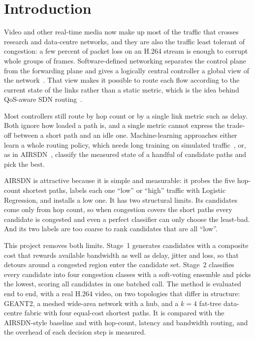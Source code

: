 \documentclass[conference,a4paper]{IEEEtran}
\begin{document}
\section{Introduction}
Video and other real-time media now make up most of the traffic that crosses research and data-centre networks,
and they are also the traffic least tolerant of congestion: a few percent of packet loss on an H.264 stream is
enough to corrupt whole groups of frames. Software-defined networking separates the control plane from the
forwarding plane and gives a logically central controller a global view of the network~\cite{mckeown2008openflow,
kreutz2015sdn}. That view makes it possible to route each flow according to the current state of the links rather
than a static metric, which is the idea behind QoS-aware SDN routing~\cite{karakus2017qos,egilmez2012openqos}.

Most controllers still route by hop count or by a single link metric such as delay. Both ignore how loaded a path
is, and a single metric cannot express the trade-off between a short path and an idle one. Machine-learning
approaches either learn a whole routing policy, which needs long training on simulated traffic~\cite{
valadarsky2017learning,almasan2022drlgnn}, or, as in AIRSDN~\cite{ipek2025airsdn}, classify the measured state of
a handful of candidate paths and pick the best.

AIRSDN is attractive because it is simple and measurable: it probes the five hop-count shortest paths, labels each
one ``low'' or ``high'' traffic with Logistic Regression, and installs a low one. It has two structural limits.
Its candidates come only from hop count, so when congestion covers the short paths every candidate is congested and
even a perfect classifier can only choose the least-bad. And its two labels are too coarse to rank candidates that
are all ``low''.

This project removes both limits. Stage~1 generates candidates with a composite cost that rewards available
bandwidth as well as delay, jitter and loss, so that detours around a congested region enter the candidate set.
Stage~2 classifies every candidate into four congestion classes with a soft-voting ensemble and picks the lowest,
scoring all candidates in one batched call. The method is evaluated end to end, with a real H.264 video, on two
topologies that differ in structure: GEANT2, a meshed wide-area network with a hub, and a $k=4$ fat-tree data-centre
fabric with four equal-cost shortest paths. It is compared with the AIRSDN-style baseline and with hop-count,
latency and bandwidth routing, and the overhead of each decision step is measured.
\end{document}
